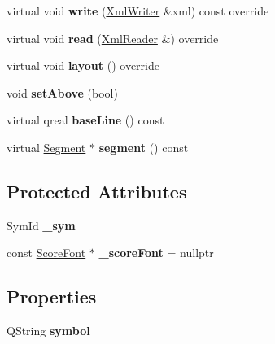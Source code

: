 \begin{DoxyCompactItemize}
\mbox{\label{class_ms_1_1_symbol_a70daf1a52e84fcbb1ae34929859ced94}} 
virtual void {\bfseries write} (\hyperlink{class_ms_1_1_xml_writer}{Xml\+Writer} \&xml) const override
\item 
\mbox{\label{class_ms_1_1_symbol_a18cdf55bf00a27df92cf4938f9683bef}} 
virtual void {\bfseries read} (\hyperlink{class_ms_1_1_xml_reader}{Xml\+Reader} \&) override
\item 
\mbox{\label{class_ms_1_1_symbol_a3c610f9bcbf4895d46dd6b0cd697c13b}} 
virtual void {\bfseries layout} () override
\item 
\mbox{\label{class_ms_1_1_symbol_aef104e40b6a9c34d8df3046486dae881}} 
void {\bfseries set\+Above} (bool)
\item 
\mbox{\label{class_ms_1_1_symbol_ab351a2e8f3f660421aae328338ff2cfa}} 
virtual qreal {\bfseries base\+Line} () const
\item 
\mbox{\label{class_ms_1_1_symbol_ae3c169724326ca1636f2086f3d954253}} 
virtual \hyperlink{class_ms_1_1_segment}{Segment} $\ast$ {\bfseries segment} () const
\end{DoxyCompactItemize}
\subsection*{Protected Attributes}
\begin{DoxyCompactItemize}
\item 
\mbox{\label{class_ms_1_1_symbol_a905ba6a7811dd1543d94e181bffb5c08}} 
Sym\+Id {\bfseries \+\_\+sym}
\item 
\mbox{\label{class_ms_1_1_symbol_a269ffed61e3dda9440b4f778ea6d40e1}} 
const \hyperlink{class_ms_1_1_score_font}{Score\+Font} $\ast$ {\bfseries \+\_\+score\+Font} = nullptr
\end{DoxyCompactItemize}
\subsection*{Properties}
\begin{DoxyCompactItemize}
\item 
\mbox{\label{class_ms_1_1_symbol_ae229fc745ca755948931ffee1c04c222}} 
Q\+String {\bfseries symbol}
\end{DoxyCompactItemize}
